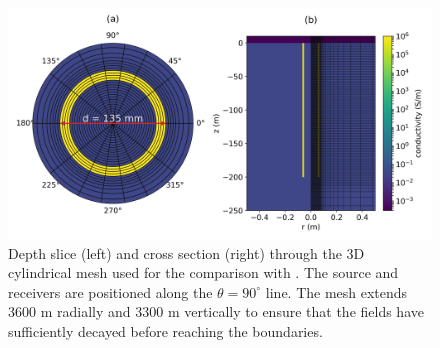 \begin{figure}
    \begin{center}
    \includegraphics[width=0.8\columnwidth]{figures/casing_software/commer_model.png}
    \end{center}
\caption{
    Depth slice (left) and cross section (right) through the 3D cylindrical
    mesh used for the comparison with \cite{Commer2015}.
    The source and receivers are positioned along the $\theta = 90^\circ$ line.
    The mesh extends 3600 m radially and 3300 m vertically to ensure that the fields
    have sufficiently decayed before reaching the boundaries.
}
\label{fig:commer_model}
\end{figure}

